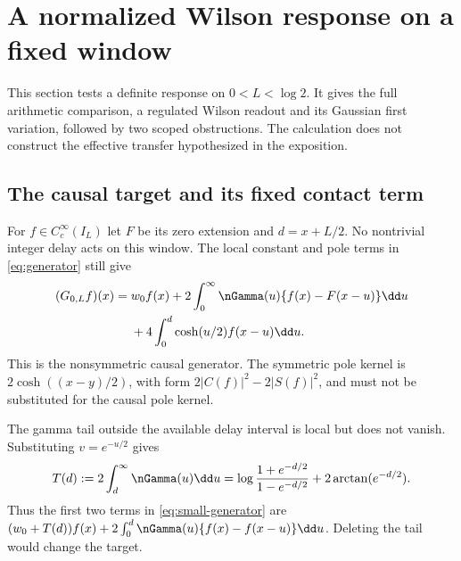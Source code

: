 \section{A normalized Wilson response on a fixed window}
\label{sec:fixed-response}

This section tests a definite response on $0<L<\log2$. It gives
the full arithmetic comparison, a regulated Wilson readout and
its Gaussian first variation, followed by two scoped
obstructions. The calculation does not construct the effective
transfer hypothesized in the exposition.

\subsection{The causal target and its fixed contact term}
\label{subsec:fixed-target}

For $f\in C_c^\infty(I_L)$ let $F$ be its zero extension and
$d=x+L/2$. No nontrivial integer delay acts on this window.
The local constant and pole terms in
\eqref{eq:generator} still give
\begin{align}\label{eq:small-generator}
 (G_{0,L}f)(x)={}&w_0f(x)+
 2\int_0^\infty\nGamma(u)\{f(x)-F(x-u)\}\dd u\notag\\
 &+4\int_0^d\cosh(u/2)f(x-u)\dd u.
\end{align}
This is the nonsymmetric causal generator. The symmetric pole
kernel is $2\cosh((x-y)/2)$, with form
$2|C(f)|^2-2|S(f)|^2$, and must not be substituted for the
causal pole kernel.

The gamma tail outside the available delay interval is local
but does not vanish. Substituting $v=e^{-u/2}$ gives
\begin{equation}\label{eq:gamma-tail}
 T(d):=2\int_d^\infty\nGamma(u)\dd u
 =\log\frac{1+e^{-d/2}}{1-e^{-d/2}}
       +2\arctan(e^{-d/2}).
\end{equation}
Thus the first two terms in \eqref{eq:small-generator} are
$(w_0+T(d))f(x)+2\int_0^d\nGamma(u)\{f(x)-f(x-u)\}\dd u$.
Deleting the tail would change the target.


